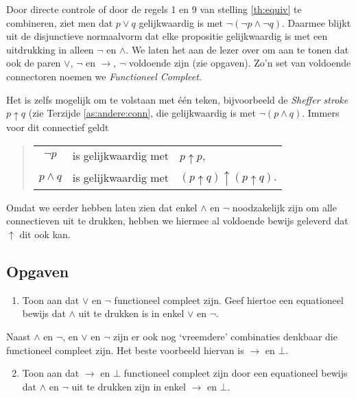 Door directe controle of door de regels 1 en 9 van stelling \ref{th:equiv} te combineren, ziet men dat $p\lor q$ gelijkwaardig is met $\neg(\neg p\land\neg q)$. Daarmee blijkt uit de disjunctieve normaalvorm dat elke propositie gelijkwaardig is met een uitdrukking in alleen $\neg$ en $\land$. We laten het aan de lezer over om aan te tonen dat ook de paren $\lor$, $\neg$ en $\rightarrow$, $\neg$ voldoende zijn (zie opgaven). Zo'n set van voldoende connectoren noemen we \textit{Functioneel Compleet}.

Het is zelfs mogelijk om te volstaan met \'e\'en teken, bijvoorbeeld de \textit{Sheffer stroke} $p\uparrow q$ (zie Terzijde \ref{as:andere:conn}, die gelijkwaardig is met $\neg(p\land q)$. Immers voor dit connectief geldt
\begin{quote}
\begin{tabular}{cll}
$\neg p$ & is gelijkwaardig met & $p\uparrow p$, \\
$p\land q$ & is gelijkwaardig met & $(p\uparrow q)\uparrow(p\uparrow q)$.
\end{tabular}
\end{quote}
Omdat we eerder hebben laten zien dat enkel $\land$ en $\neg$ noodzakelijk zijn om alle connectieven uit te drukken, hebben we hiermee al voldoende bewijs geleverd dat $\uparrow$ dit ook kan.

\subsection{Opgaven}
\begin{exercise}\mbox{}
\begin{enumerate}[label=\textit{\alph*.}]
\item Toon aan dat $\lor$ en $\neg$ functioneel compleet zijn. Geef hiertoe een equationeel bewijs dat $\land$ uit te drukken is in enkel $\lor$ en $\neg$.
\end{enumerate}
Naast $\land$ en $\neg$, en $\lor$ en $\neg$ zijn er ook nog `vreemdere' combinaties denkbaar die functioneel compleet zijn. Het beste voorbeeld hiervan is $\rightarrow$ en $\bot$.
\begin{enumerate}[label=\textit{\alph*.}]
\setcounter{enumi}{1}
\item Toon aan dat $\rightarrow$ en $\bot$ functioneel compleet zijn door een equationeel bewijs dat $\land$ en $\neg$ uit te drukken zijn in enkel $\rightarrow$ en $\bot$.
\end{enumerate}
\end{exercise}

